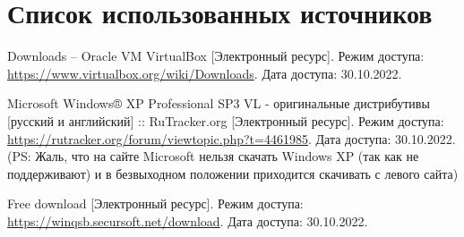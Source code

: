 \newpage

\begingroup
  \section*{Список использованных источников}

  \renewcommand{\addcontentsline}[3]{}%
  \renewcommand{\section}[2]{}%

  \begin{thebibliography}{}
    Downloads – Oracle VM VirtualBox
    [Электронный ресурс].
    Режим доступа: \url{https://www.virtualbox.org/wiki/Downloads}.
    Дата доступа: 30.10.2022.

    Microsoft Windows® XP Professional SP3 VL - оригинальные дистрибутивы [русский и английский] :: RuTracker.org
    [Электронный ресурс].
    Режим доступа: \url{https://rutracker.org/forum/viewtopic.php?t=4461985}.
    Дата доступа: 30.10.2022.
    \\(PS: Жаль, что на сайте Microsoft нельзя скачать Windows XP (так как не поддерживают) и в безвыходном положении приходится скачивать с левого сайта)

    Free download
    [Электронный ресурс].
    Режим доступа: \url{https://winqsb.secursoft.net/download}.
    Дата доступа: 30.10.2022. 
  \end{thebibliography}
\endgroup


\begingroup
  \section*{Литература, чтобы писать в \TeX~(\LaTeX)}
  \addcontentsline{toc}{section}{Литература, чтобы писать в LaTeX}

  \renewcommand{\addcontentsline}[3]{}%
  \renewcommand{\section}[2]{}%

